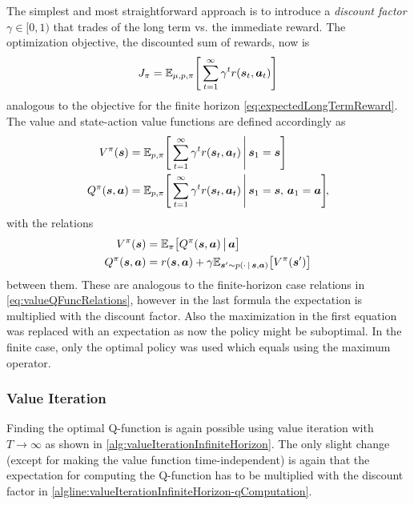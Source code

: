 			The simplest and most straightforward approach is to introduce a \emph{discount factor} \( \gamma \in [0, 1) \) that trades of the long term vs. the immediate reward. The optimization objective, the discounted sum of rewards, now is
			\begin{equation*}
				J_\pi = \mathbb{E}_{\mu, p, \pi} \Bigg[ \sum_{t = 1}^{\infty} \gamma^t r(\bm{s}_t, \bm{a}_t) \Bigg]  \label{eq:expectedDiscountedLongTermReward}
			\end{equation*}
			analogous to the objective for the finite horizon \eqref{eq:expectedLongTermReward}. The value and state-action value functions are defined accordingly as
			\begin{align*}
				V^\pi(\bm{s})          & = \mathbb{E}_{p, \pi}\Bigg[ \sum_{t = 1}^{\infty} \gamma^t r(\bm{s}_t, \bm{a}_t) \,\Bigg\vert\, \bm{s}_1 = \bm{s} \Bigg]                           \\
				Q^\pi(\bm{s}, \bm{a}) & = \mathbb{E}_{p, \pi}\Bigg[ \sum_{t = 1}^{\infty} \gamma^t r(\bm{s}_t, \bm{a}_t) \,\Bigg\vert\, \bm{s}_1 = \bm{s},\, \bm{a}_1 = \bm{a} \Bigg]\!,
			\end{align*}
			with the relations
			\begin{align*}
				V^\pi(\bm{s})          & = \mathbb{E}_\pi\big[ Q^\pi(\bm{s}, \bm{a}) \,\big\vert\, \bm{a} \big]                                                 \\
				Q^\pi(\bm{s}, \bm{a}) & = r(\bm{s}, \bm{a}) + \gamma \mathbb{E}_{\bm{s}' \sim p(\cdot \,\vert\, \bm{s}, \bm{a})}\big[ V^\pi(\bm{s}') \big]
			\end{align*}
			between them. These are analogous to the finite-horizon case relations in \eqref{eq:valueQFuncRelations}, however in the last formula the expectation is multiplied with the discount factor. Also the maximization in the first equation was replaced with an expectation as now the policy might be suboptimal. In the finite case, only the optimal policy was used which equals using the maximum operator.

			\subsubsection{Value Iteration}
				Finding the optimal Q-function is again possible using value iteration with \( T \to \infty \) as shown in \autoref{alg:valueIterationInfiniteHorizon}. The only slight change (except for making the value function time-independent) is again that the expectation for computing the Q-function has to be multiplied with the discount factor in \autoref{algline:valueIterationInfiniteHorizon-qComputation}.


